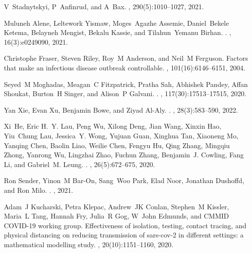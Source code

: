 \documentclass[12pt]{article}
\begin{document}
\begin{thebibliography}{10}
V~Stadnytskyi, P~Anfinrud, and A~Bax.
, 290(5):1010--1027, 2021.

Muluneh Alene, Leltework Yismaw, Moges~Agazhe Assemie, Daniel~Bekele Ketema,
  Belayneh Mengist, Bekalu Kassie, and Tilahun~Yemanu Birhan.
.
, 16(3):e0249090, 2021.

Christophe Fraser, Steven Riley, Roy~M Anderson, and Neil~M Ferguson.
\newblock Factors that make an infectious disease outbreak controllable.
,
  101(16):6146--6151, 2004.

Seyed~M Moghadas, Meagan~C Fitzpatrick, Pratha Sah, Abhishek Pandey, Affan
  Shoukat, Burton~H Singer, and Alison~P Galvani.
.
,
  117(30):17513--17515, 2020.

Yan Xie, Evan Xu, Benjamin Bowe, and Ziyad Al-Aly.
.
, 28(3):583--590, 2022.

Xi~He, Eric H.~Y. Lau, Peng Wu, Xilong Deng, Jian Wang, Xinxin Hao, Yiu~Chung
  Lau, Jessica~Y. Wong, Yujuan Guan, Xinghua Tan, Xiaoneng Mo, Yanqing Chen,
  Baolin Liao, Weilie Chen, Fengyu Hu, Qing Zhang, Mingqiu Zhong, Yanrong Wu,
  Lingzhai Zhao, Fuchun Zhang, Benjamin~J. Cowling, Fang Li, and Gabriel~M.
  Leung.
.
, 26(5):672--675, 2020.

Ron Sender, Yinon~M Bar-On, Sang~Woo Park, Elad Noor, Jonathan Dushoffd, and
  Ron Milo.
.
, 2021.

Adam~J Kucharski, Petra Klepac, Andrew~JK Conlan, Stephen~M Kissler, Maria~L
  Tang, Hannah Fry, Julia~R Gog, W~John Edmunds, and {CMMID COVID-19 working
  group}.
\newblock Effectiveness of isolation, testing, contact tracing, and physical
  distancing on reducing transmission of sars-cov-2 in different settings: a
  mathematical modelling study.
, 20(10):1151--1160, 2020.


\end{thebibliography}
\end{document}

